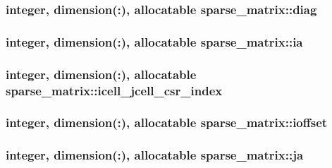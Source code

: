 \hypertarget{classsparse__matrix_a79931d26508e8a91c9d8f01ac9577ec9}{
\subsubsection[{diag}]{\setlength{\rightskip}{0pt plus 5cm}integer, dimension(\-:), allocatable sparse\-\_\-matrix\-::diag}}\label{classsparse__matrix_a79931d26508e8a91c9d8f01ac9577ec9}
\hypertarget{classsparse__matrix_a9c09a4d79a9e8dba4676b4a9c8d8c03f}{
\subsubsection[{ia}]{\setlength{\rightskip}{0pt plus 5cm}integer, dimension(\-:), allocatable sparse\-\_\-matrix\-::ia}}\label{classsparse__matrix_a9c09a4d79a9e8dba4676b4a9c8d8c03f}
\hypertarget{classsparse__matrix_ab518ae98fdc57bba1c644f1cfeff9126}{
\subsubsection[{icell\-\_\-jcell\-\_\-csr\-\_\-index}]{\setlength{\rightskip}{0pt plus 5cm}integer, dimension(\-:), allocatable sparse\-\_\-matrix\-::icell\-\_\-jcell\-\_\-csr\-\_\-index}}\label{classsparse__matrix_ab518ae98fdc57bba1c644f1cfeff9126}
\hypertarget{classsparse__matrix_a0fe5fb1f5d374957667c8c6d518f0496}{
\subsubsection[{ioffset}]{\setlength{\rightskip}{0pt plus 5cm}integer, dimension(\-:), allocatable sparse\-\_\-matrix\-::ioffset}}\label{classsparse__matrix_a0fe5fb1f5d374957667c8c6d518f0496}
\hypertarget{classsparse__matrix_a22b8c3020caa557baaea011f3573ff86}{
\subsubsection[{ja}]{\setlength{\rightskip}{0pt plus 5cm}integer, dimension(\-:), allocatable sparse\-\_\-matrix\-::ja}}\label{classsparse__matrix_a22b8c3020caa557baaea011f3573ff86}
